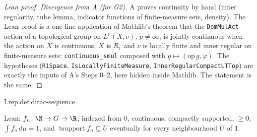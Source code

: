 \begin{proof}[Lean proof]
\emph{Divergence from A (for G2).} A proves continuity by hand (inner regularity, tube lemma, indicator functions of finite-measure sets, density). The Lean proof is a one-line application of Mathlib's theorem that the \texttt{DomMulAct} action of a topological group on $L^p(X,\nu)$, $p\neq\infty$, is jointly continuous when the action on $X$ is continuous, $X$ is $R_1$ and $\nu$ is locally finite and inner regular on finite-measure sets: \texttt{continuous\_smul} composed with $g\mapsto(\mathrm{op}\,g,\varphi)$. The hypotheses (\texttt{R1Space}, \texttt{IsLocallyFiniteMeasure}, \texttt{InnerRegularCompactLTTop}) are exactly the inputs of A's Steps 0--2, here hidden inside Mathlib. The statement is the same.
\end{proof}

\begin{definition}
\end{definition}
\begin{tfformal}{I.rep.def:dirac-sequence}
\begin{tffidelity}
Lean: $f_n\colon\N\to G\to\R$, indexed from $0$, continuous, compactly supported, $\ge0$, $\int f_n\,d\mu=1$, and $\operatorname{tsupport}f_n\subseteq U$ eventually for every neighbourhood $U$ of $1$.
\end{tffidelity}
\end{tfformal}

